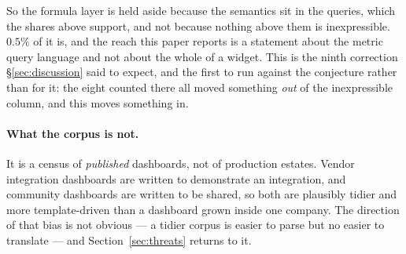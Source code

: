 So the formula layer is held aside because the semantics sit in the queries, which the
shares above support, and not because nothing above them is inexpressible. $0.5\%$ of
it is, and the reach this paper reports is a statement about the metric query language
and not about the whole of a widget. This is the ninth correction
\S\ref{sec:discussion} said to expect, and the first to run against the conjecture
rather than for it: the eight counted there all moved something \emph{out} of the inexpressible
column, and this moves something in.

\paragraph{What the corpus is not.}
It is a census of \emph{published} dashboards, not of production estates. Vendor
integration dashboards are written to demonstrate an integration, and community
dashboards are written to be shared, so both are plausibly tidier and more
template-driven than a dashboard grown inside one company. The direction of that bias is
not obvious --- a tidier corpus is easier to parse but no easier to translate --- and
Section~\ref{sec:threats} returns to it.

